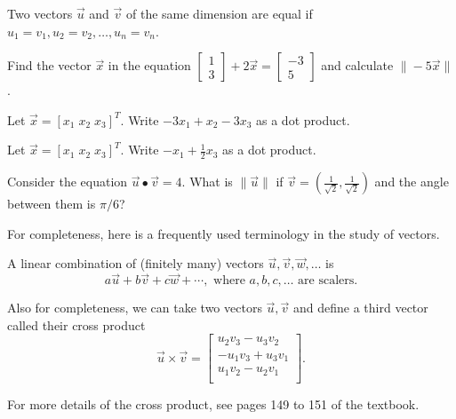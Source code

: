 \documentclass[../main.tex]{subfiles}
\begin{document}
\faStar{} Two vectors \(\vec{u}\) and \(\vec{v}\) of the same dimension are equal if \(u_{1} = v_{1}, u_{2} = v_{2}, \dots, u_{n} = v_{n}\).  

\begin{example}
  Find the vector \(\vec{x}\) in the equation \(\begin{bmatrix} 1 \\ 3 \end{bmatrix} + 2 \vec{x} = \begin{bmatrix} -3 \\ 5 \end{bmatrix}\) and calculate \(\| -5 \vec{x} \|\).

\end{example}

\begin{example}
  Let \(\vec{x} = [ x_{1} \; x_{2} \; x_{3} ]^{T}\).  Write \(-3x_{1} + x_{2} - 3x_{3}\) as a dot product. 

\end{example}

\begin{example}
  Let \(\vec{x} = [ x_{1} \; x_{2} \; x_{3} ]^{T}\).  Write \(- x_{1} + \tfrac{1}{2}x_{3}\) as a dot product. 
  
\end{example}

\begin{example}
  Consider the equation \(\vec{u} \bullet \vec{v} = 4\). What is \(\|\vec{u}\|\) if \(\vec{v} = \left(\tfrac{1}{\sqrt{2}}, \tfrac{1}{\sqrt{2}}\right)\) and the angle between them is \(\pi/6\)?

\end{example}

For completeness, here is a frequently used terminology in the study of vectors.

A linear combination of (finitely many) vectors \(\vec{u}, \vec{v}, \vec{w}, \ldots\) is 
\[
  a \vec{u} + b \vec{v} + c \vec{w} + \cdots, \text{ where \(a,b,c, \ldots\) are scalers}.
\]

Also for completeness, we can take two vectors \(\vec{u}, \vec{v}\) and define a third vector called their cross product 
\[
  \vec{u} \times \vec{v} = 
  \begin{bmatrix}
    u_{2} v_{3} - u_{3} v_{2} \\
    - u_{1} v_{3} + u_{3} v_{1} \\
    u_{1} v_{2} - u_{2} v_{1} \\
  \end{bmatrix}.
\]

For more details of the cross product, see pages 149 to 151 of the textbook. 
\end{document}
